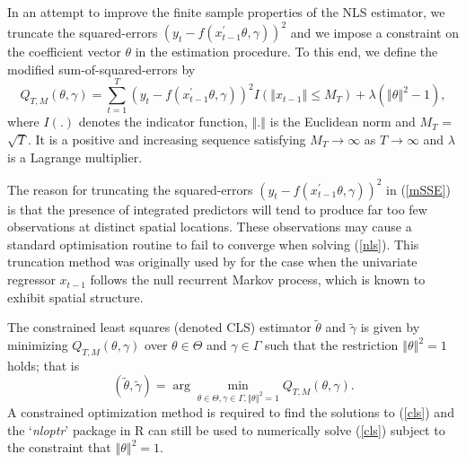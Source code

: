 \documentclass[a4paper,12pt,times,numbered,print,index]{report}
\numberwithin{equation}{section}
\begin{document}
	
	
	In an attempt to improve the finite sample properties of the NLS estimator, we truncate the squared-errors $\left( y_{t}-f\left(
	x_{t-1}^{\prime }\theta ,\gamma \right) \right) ^{2}$ and we impose a constraint on the coefficient vector $\theta $ in the estimation procedure. To this end, we define the modified sum-of-squared-errors by%
	\begin{equation}
		Q_{T,M}\left( \theta ,\gamma \right) =\sum_{t=1}^{T}\left( y_{t}-f\left(
		x_{t-1}^{\prime }\theta ,\gamma \right) \right) ^{2}I\left( \left\Vert
		x_{t-1}\right\Vert \leq M_{T}\right) +\lambda \left( \left\Vert \theta
		\right\Vert ^{2}-1\right) ,  
		\label{mSSE}
	\end{equation}%
	where $I\left( .\right) $ denotes the indicator function, $%
	\left\Vert .\right\Vert $ is the Euclidean norm and $M_T$ = $\sqrt{T}$. It is a positive and increasing sequence satisfying $ M_{T}\rightarrow \infty $ as $T \rightarrow \infty $ and $\lambda $ is a Lagrange
	multiplier. 
	
	The reason for truncating the squared-errors $\left( y_{t}-f\left(
	x_{t-1}^{\prime }\theta ,\gamma \right) \right) ^{2}$ in (\ref{mSSE}) is that the presence
	of integrated predictors will tend to produce far too few observations at distinct spatial locations. These observations may cause a standard
	optimisation routine to fail to converge when solving (\ref{nls}). 
	This truncation method was originally used by \cite{li2016estimation} for the case when the univariate regressor $x_{t-1}$ follows the null recurrent Markov process, which is known to exhibit spatial structure. 
	
	
	The constrained least squares (denoted CLS) estimator $\widetilde{\theta}$ and $%
	\widetilde{\gamma}$ is given by minimizing $Q_{T,M}\left( \theta ,\gamma \right) 
	$ over $\theta \in \Theta $ and $\gamma \in \Gamma $ such that the
	restriction $\left\Vert \theta \right\Vert ^{2}=1$ holds; that is%
	\begin{equation}
		\left( \widetilde{\theta},\widetilde{\gamma}\right) =\arg \min_{\theta \in \Theta
			,\gamma \in \Gamma ,\left\Vert \theta \right\Vert ^{2}=1}Q_{T,M}\left(
		\theta ,\gamma \right) .  \label{cls}
	\end{equation}%
	A constrained optimization method is required to find the solutions to (\ref{cls}) and the `\textit{nloptr}' package in R can still be used to numerically solve (\ref{cls}) subject to the constraint that $\left\Vert \theta \right\Vert ^{2}=1.$
	
\end{document}
